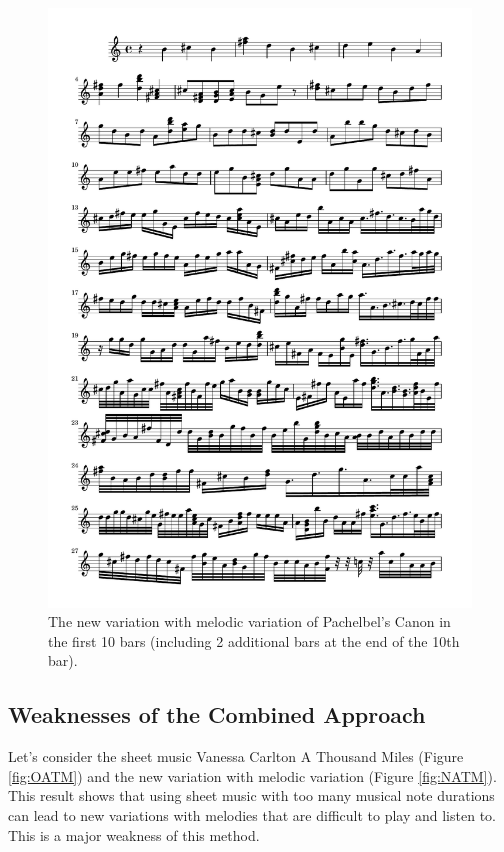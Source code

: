 \documentclass[11pt]{article}
\theoremstyle{definition}
\begin{document}
\begin{figure}
\centering
\includegraphics[trim=1cm 20.3cm 1cm 0.5cm, clip, scale=0.6]{New_CND.pdf}
\caption{The new variation with melodic variation of Pachelbel's Canon in the first 10 bars (including 2 additional bars at the end of the 10th bar).} 
\label{fig:NCND}
\end{figure}

\subsection{Weaknesses of the Combined Approach}

Let's consider the sheet music Vanessa Carlton A Thousand Miles (Figure \ref{fig:OATM}) and the new variation with melodic variation (Figure \ref{fig:NATM}). This result shows that using sheet music with too many musical note durations can lead to new variations with melodies that are difficult to play and listen to. This is a major weakness of this method.
\end{document}

